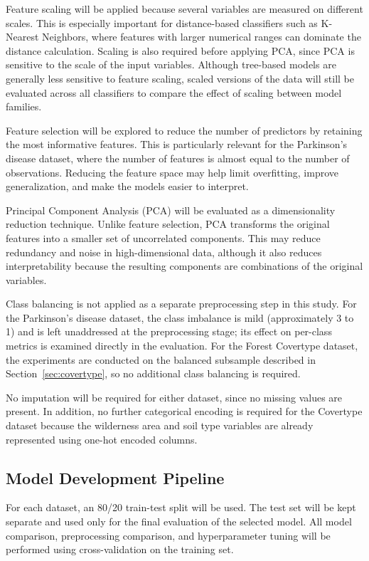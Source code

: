 \documentclass[11pt,a4paper]{article}
\begin{document}
Feature scaling will be applied because several variables are measured on
different scales. This is especially important for distance-based classifiers
such as K-Nearest Neighbors, where features with larger numerical ranges can
dominate the distance calculation. Scaling is also required before applying
PCA, since PCA is sensitive to the scale of the input variables. Although
tree-based models are generally less sensitive to feature scaling, scaled
versions of the data will still be evaluated across all classifiers to compare
the effect of scaling between model families.

Feature selection will be explored to reduce the number of predictors by
retaining the most informative features. This is particularly relevant for the
Parkinson's disease dataset, where the number of features is almost equal to
the number of observations. Reducing the feature space may help limit
overfitting, improve generalization, and make the models easier to interpret.

Principal Component Analysis (PCA) will be evaluated as a dimensionality
reduction technique. Unlike feature selection, PCA transforms the original
features into a smaller set of uncorrelated components. This may reduce
redundancy and noise in high-dimensional data, although it also reduces
interpretability because the resulting components are combinations of the
original variables.

Class balancing is not applied as a separate preprocessing step in this study.
For the Parkinson's disease dataset, the class imbalance is mild (approximately
3 to 1) and is left unaddressed at the preprocessing stage; its effect on
per-class metrics is examined directly in the evaluation. For the Forest
Covertype dataset, the experiments are conducted on the balanced subsample
described in Section~\ref{sec:covertype}, so no additional class balancing is
required.

No imputation will be required for either dataset, since no missing values are
present. In addition, no further categorical encoding is required for the
Covertype dataset because the wilderness area and soil type variables are
already represented using one-hot encoded columns.

\subsection{Model Development Pipeline}

For each dataset, an 80/20 train-test split will be used. The test set will be
kept separate and used only for the final evaluation of the selected model.
All model comparison, preprocessing comparison, and hyperparameter tuning will
be performed using cross-validation on the training set.
\end{document}
